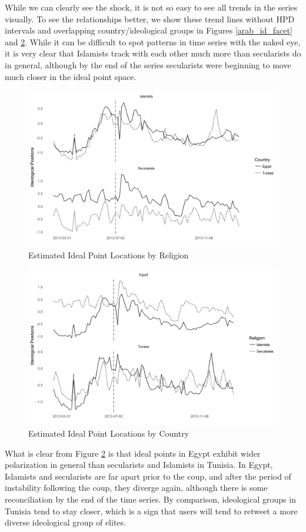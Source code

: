 \documentclass[12pt]{article}
\begin{document}
While we can clearly see the shock, it is not so easy to see all trends in the series visually. To see the relationships better, we show these trend lines without HPD intervals and overlapping country/ideological groups in Figures \ref{arab_id_facet} and \ref{country_facet}. While it can be difficult to spot patterns in time series with the naked eye, it is very clear that Islamists track with each other much more than secularists do in general, although by the end of the series secularists were beginning to move much closer in the ideal point space. 
 \begin{figure}[!h]
 	\centering
	\caption{Estimated Ideal Point Locations by Religion}\label{religion_facet}
	\centering
	\includegraphics[width=.9\linewidth]{religion_coint}
\end{figure}
 \begin{figure}[!h]
 	\centering
	\caption{Estimated Ideal Point Locations by Country}\label{country_facet}
	\centering
	\includegraphics[width=.9\linewidth]{country_coint}
\end{figure}

What is clear from Figure \ref{country_facet} is that ideal points in Egypt exhibit wider polarization in general than secularists and Islamists in Tunisia. In Egypt, Islamists and secularists are far apart prior to the coup, and after the period of instability following the coup, they diverge again, although there is some reconciliation by the end of the time series. By comparison, ideological groups in Tunisia tend to stay closer, which is a sign that users will tend to retweet a more diverse ideological group of elites. 
\end{document}
